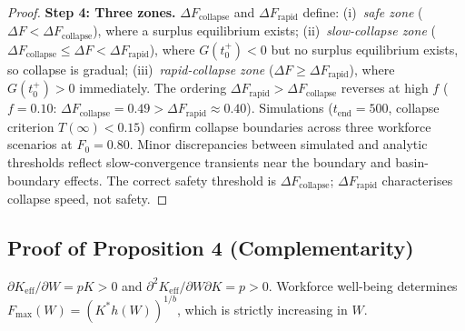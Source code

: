 \documentclass[msom,dblanonrev]{informs4}
\newcommand{\Keff}{K_{\mathrm{eff}}}
\begin{document}
\begin{proof}
\textbf{Step 4: Three zones.} $\Delta F_{\mathrm{collapse}}$ and $\Delta F_{\mathrm{rapid}}$ define: (i)~\emph{safe zone} ($\Delta F < \Delta F_{\mathrm{collapse}}$), where a surplus equilibrium exists; (ii)~\emph{slow-collapse zone} ($\Delta F_{\mathrm{collapse}} \leq \Delta F < \Delta F_{\mathrm{rapid}}$), where $G(t_0^+) < 0$ but no surplus equilibrium exists, so collapse is gradual; (iii)~\emph{rapid-collapse zone} ($\Delta F \geq \Delta F_{\mathrm{rapid}}$), where $G(t_0^+) > 0$ immediately. The ordering $\Delta F_{\mathrm{rapid}} > \Delta F_{\mathrm{collapse}}$ reverses at high $f$ ($f{=}0.10$: $\Delta F_{\mathrm{collapse}} = 0.49 > \Delta F_{\mathrm{rapid}} \approx 0.40$). Simulations ($t_{\mathrm{end}}{=}500$, collapse criterion $T(\infty) < 0.15$) confirm collapse boundaries across three workforce scenarios at $F_0{=}0.80$. Minor discrepancies between simulated and analytic thresholds reflect slow-convergence transients near the boundary and basin-boundary effects. The correct safety threshold is $\Delta F_{\mathrm{collapse}}$; $\Delta F_{\mathrm{rapid}}$ characterises collapse speed, not safety. \Halmos
\end{proof}


\subsection{Proof of Proposition 4 (Complementarity)}\label{sec:ec:proof4}
\setcounter{proposition}{3}
\begin{proposition}
$\partial \Keff / \partial W = pK > 0$ and $\partial^2 \Keff / \partial W \partial K = p > 0$. Workforce well-being determines $F_{\max}(W) = (K^* h(W))^{1/b}$, which is strictly increasing in $W$.
\end{proposition}
\end{document}
